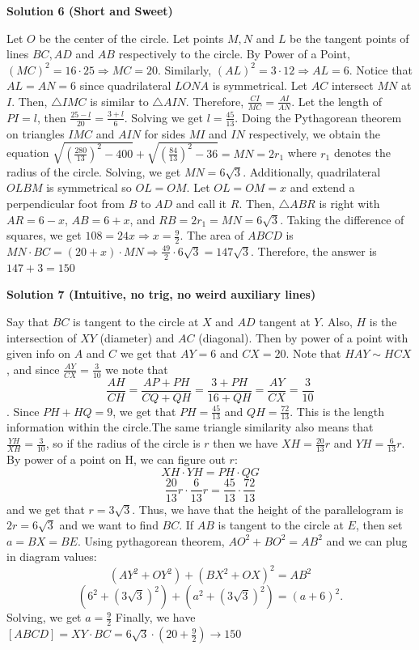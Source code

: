 \begin{enumerate}
 



\textbf{Solution 6 (Short and Sweet)}

Let $O$ be the center of the circle. Let points $M, N$ and $L$ be the tangent points of lines $BC, AD$ and $AB$ respectively to the circle. By Power of a Point, $({MC})^2=16\cdot{25} \Longrightarrow MC=20$. Similarly, $({AL})^2=3\cdot{12} \Longrightarrow AL=6$. Notice that $AL=AN=6$ since quadrilateral $LONA$ is symmetrical. Let $AC$ intersect $MN$ at $I$. Then, $\bigtriangleup{IMC}$ is similar to $\bigtriangleup{AIN}$. Therefore, $\frac{CI}{MC}=\frac{AI}{AN}$. Let the length of $PI=l$, then $\frac{25-l}{20}=\frac{3+l}{6}$. Solving we get $l=\frac{45}{13}$. Doing the Pythagorean theorem on triangles $IMC$ and $AIN$ for sides $MI$ and $IN$ respectively, we obtain the equation $\sqrt{(\frac{280}{13})^2-400} +\sqrt{(\frac{84}{13})^2-36}=MN=2r_1$ where $r_1$ denotes the radius of the circle. Solving, we get $MN=6\sqrt{3}$. Additionally, quadrilateral $OLBM$ is symmetrical so $OL=OM$. Let $OL=OM=x$ and extend a perpendicular foot from $B$ to $AD$ and call it $R$. Then, $\bigtriangleup{ABR}$ is right with $AR=6-x$, $AB=6+x$, and $RB=2r_1=MN=6\sqrt{3}$. Taking the difference of squares, we get $108=24x \Longrightarrow x=\frac{9}{2}$. The area of $ABCD$ is $MN\cdot{BC}=(20+x)\cdot{MN} \Longrightarrow \frac{49}{2}\cdot{6\sqrt{3}}=147\sqrt{3}$. Therefore, the answer is $147+3=\boxed{150}$




\textbf{Solution 7 (Intuitive, no trig, no weird auxiliary lines)}

Say that $BC$ is tangent to the circle at $X$ and $AD$ tangent at $Y$. Also, $H$ is the intersection of $XY$ (diameter) and $AC$ (diagonal). Then by power of a point with given info on $A$ and $C$ we get that $AY=6$ and $CX=20$. Note that $HAY \sim HCX$, and since $\frac{AY}{CX}=\frac{3}{10}$ we note that 
 \[\frac{AH}{CH} = \frac{AP+PH}{CQ+QH} = \frac{3+PH}{16+QH} =\frac{AY}{CX}=\frac{3}{10}\]. Since $PH+HQ=9$, we get that $PH=\frac{45}{13}$ and $QH=\frac{72}{13}$. This is the length information within the circle.The same triangle similarity also means that $\frac{YH}{XH}=\frac{3}{10}$, so if the radius of the circle is $r$ then we have $XH=\frac{20}{13}r$ and $YH = \frac{6}{13}r$. By power of a point on H, we can figure out $r$:
 \[XH\cdot YH = PH \cdot QG\]
 \[\frac{20}{13}r \cdot \frac{6}{13}r = \frac{45}{13} \cdot \frac{72}{13}\]and we get that $r = 3 \sqrt 3$. Thus, we have that the height of the parallelogram is $2r=6 \sqrt 3$ and we want to find $BC$. If $AB$ is tangent to the circle at $E$, then set $a = BX = BE$. Using pythagorean theorem, $AO^2+BO^2=AB^2$ and we can plug in diagram values: 
 \[(AY^2+OY^2)+(BX^2+OX)^2=AB^2\] 
 \[(6^2+(3 \sqrt 3)^2) + (a^2+(3 \sqrt 3)^2)=(a+6)^2.\] Solving, we get $a=\frac{9}{2}$ Finally, we have $[ABCD]=XY \cdot BC = 6 \sqrt 3 \cdot (20+\frac{9}{2}) \rightarrow \boxed{150}$





\end{enumerate}

